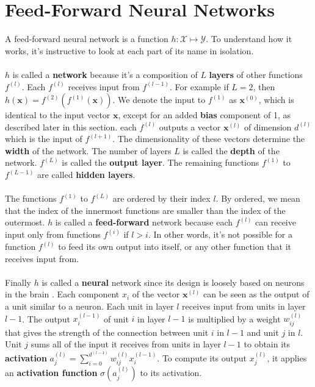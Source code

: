 \section{Feed-Forward Neural Networks}
A feed-forward neural network is a function $h: \mathcal{X} \mapsto \mathcal{Y}$. To understand how it works, it's instructive to look at each part of its name in isolation.
\\\\
$h$ is called a \textbf{network} because it's a composition of $L$ \textbf{layers} of other functions $f^{(l)}$. Each $f^{(l)}$ receives input from $f^{(l-1)}$. For example if $L = 2$, then $h(\mathbf{x}) = f^{(2)}(f^{(1)}(\mathbf{x}))$. We denote the input to $f^{(1)}$ as $\mathbf{x}^{(0)}$, which is identical to the input vector $\mathbf{x}$, except for an added \textbf{bias} component of 1, as described later in this section. each $f^{(l)}$ outputs a vector $\mathbf{x}^{(l)}$ of dimension $d^{(l)}$ which is the input of $f^{(l+1)}$. The dimensionality of these vectors determine the \textbf{width} of the network. The number of layers $L$ is called the \textbf{depth} of the network. $f^{(L)}$ is called the \textbf{output layer}. The remaining functions $f^{(1)}$ to $f^{(L-1)}$ are called \textbf{hidden layers}. 
\\\\
The functions $f^{(1)}$ to $f^{(L)}$ are ordered by their index $l$. By ordered, we mean that the index of the innermost functions are smaller than the index of the outermost. $h$ is called a \textbf{feed-forward} network because each $f^{(l)}$ can receive input only from functions $f^{(i)}$ if $l > i$. In other words, it's not possible for a function $f^{(l)}$ to feed its own output into itself, or any other function that it receives input from.
\\\\
Finally $h$ is called a \textbf{neural} network since its design is loosely based on neurons in the brain \citep{goodfellow16}. Each component $x_i$ of the vector $\mathbf{x}^{(l)}$ can be seen as the output of a unit similar to a neuron. Each unit in layer $l$ receives input from units in layer $l-1$. The output $x^{(l-1)}_i$ of unit $i$ in layer $l-1$ is multiplied by a weight $w^{(l)}_{ij}$ that gives the strength of the connection between unit $i$ in $l-1$ and unit $j$ in $l$. Unit $j$ sums all of the input it receives from units in layer $l-1$ to obtain its \textbf{activation} $a^{(l)}_j = \sum_{i=0}^{d^{(l-1)}} w^{(l)}_{ij}x^{(l-1)}_{i}$. To compute its output $x^{(l)}_j$, it applies an \textbf{activation function} $\sigma(a^{(l)}_j)$ to its activation.


